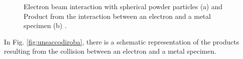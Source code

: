 \begin{figure}
    \centering
    \qquad
    \caption[Laser interactions and laser intensity.]{Electron beam interaction with spherical powder particles (a) and Product from the interaction between an electron and a metal specimen (b) \cite{tushar_ramkrishna_mahale_electron_2009, krumeich_properties_2015}.}
\end{figure}
In Fig. \ref{fig:unsaccodiroba}, there is a schematic representation of the products resulting from the collision between an electron and a metal specimen.


